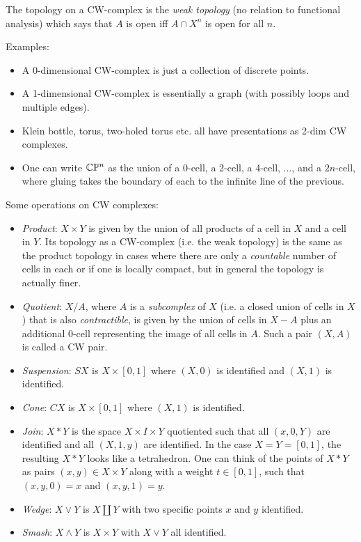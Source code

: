 \documentclass{amsart}
\begin{document}
	The topology on a CW-complex is the \textit{weak topology} (no relation to functional analysis) which says that $A$ is open iff $A\cap X^n$ is open for all $n$.
	
	Examples:
	\begin{itemize}
		\item A 0-dimensional CW-complex is just a collection of discrete points.
		\item A 1-dimensional CW-complex is essentially a graph (with possibly loops and multiple edges).
		\item Klein bottle, torus, two-holed torus etc. all have presentations as 2-dim CW complexes.
		\item One can write $\mathbb{C}\mathbb{P}^n$ as the union of a 0-cell, a 2-cell, a 4-cell, $\dots$, and a $2n$-cell, where gluing takes the boundary of each to the infinite line of the previous.
	\end{itemize}
	
	Some operations on CW complexes:
	\begin{itemize}
		\item \textit{Product}: $X\times Y$ is given by the union of all products of a cell in $X$ and a cell in $Y$. Its topology as a CW-complex (i.e. the weak topology) is the same as the product topology in cases where there are only a \textit{countable} number of cells in each or if one is locally compact, but in general the topology is actually finer.
		\item \textit{Quotient}: $X/A$, where $A$ is a \textit{subcomplex} of $X$ (i.e. a closed union of cells in $X$) that is also \textit{contractible}, is given by the union of cells in $X-A$ plus an additional 0-cell representing the image of all cells in $A$. Such a pair $(X,A)$ is called a CW pair.
		\item \textit{Suspension}: $SX$ is $X\times [0,1]$ where $(X,0)$ is identified and $(X,1)$ is identified.
		\item \textit{Cone}: $CX$ is $X\times [0,1]$ where $(X,1)$ is identified.
		\item \textit{Join}: $X\ast Y$ is the space $X\times I \times Y$ quotiented such that all $(x,0,Y)$ are identified and all $(X,1,y)$ are identified. In the case $X=Y=[0,1]$, the resulting $X\ast Y$ looks like a tetrahedron. One can think of the points of $X\ast Y$ as pairs $(x,y)\in X\times Y$ along with a weight $t\in [0,1]$, such that $(x,y,0)=x$ and $(x,y,1)=y$.
		\item \textit{Wedge}: $X\vee Y$ is $X\coprod Y$ with two specific points $x$ and $y$ identified.
		\item \textit{Smash}: $X\wedge Y$ is $X\times Y$ with $X\vee Y$ all identified.
	\end{itemize}
	
\end{document}
